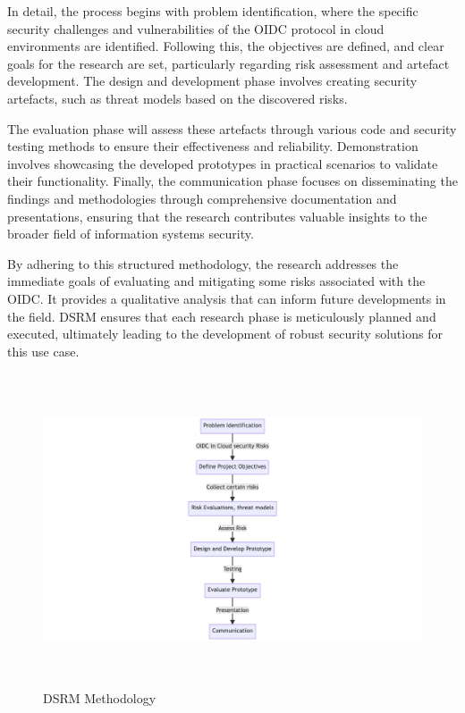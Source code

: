 In detail, the process begins with problem identification, where the specific security challenges and vulnerabilities of the OIDC protocol in cloud environments are identified. Following this, the objectives are defined, and clear goals for the research are set, particularly regarding risk assessment and artefact development. The design and development phase involves creating security artefacts, such as threat models based on the discovered risks.

The evaluation phase will assess these artefacts through various code and security testing methods to ensure their effectiveness and reliability. Demonstration involves showcasing the developed prototypes in practical scenarios to validate their functionality. Finally, the communication phase focuses on disseminating the findings and methodologies through comprehensive documentation and presentations, ensuring that the research contributes valuable insights to the broader field of information systems security.

By adhering to this structured methodology, the research addresses the immediate goals of evaluating and mitigating some risks associated with the OIDC. It provides a qualitative analysis that can inform future developments in the field. DSRM ensures that each research phase is meticulously planned and executed, ultimately leading to the development of robust security solutions for this use case.

\begin{figure}[h!]
\centering
\label{fig:dsrm}
\includegraphics[width=\textwidth, height=350px]{pics/dsrm.png}
\caption{DSRM Methodology}
\end{figure}

